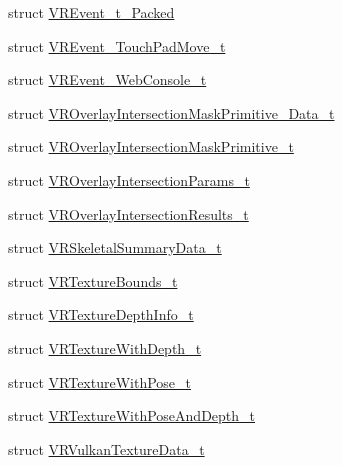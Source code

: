 \begin{DoxyCompactItemize}
struct \mbox{\hyperlink{struct_valve_1_1_v_r_1_1_v_r_event__t___packed}{V\+R\+Event\+\_\+t\+\_\+\+Packed}}
\item 
struct \mbox{\hyperlink{struct_valve_1_1_v_r_1_1_v_r_event___touch_pad_move__t}{V\+R\+Event\+\_\+\+Touch\+Pad\+Move\+\_\+t}}
\item 
struct \mbox{\hyperlink{struct_valve_1_1_v_r_1_1_v_r_event___web_console__t}{V\+R\+Event\+\_\+\+Web\+Console\+\_\+t}}
\item 
struct \mbox{\hyperlink{struct_valve_1_1_v_r_1_1_v_r_overlay_intersection_mask_primitive___data__t}{V\+R\+Overlay\+Intersection\+Mask\+Primitive\+\_\+\+Data\+\_\+t}}
\item 
struct \mbox{\hyperlink{struct_valve_1_1_v_r_1_1_v_r_overlay_intersection_mask_primitive__t}{V\+R\+Overlay\+Intersection\+Mask\+Primitive\+\_\+t}}
\item 
struct \mbox{\hyperlink{struct_valve_1_1_v_r_1_1_v_r_overlay_intersection_params__t}{V\+R\+Overlay\+Intersection\+Params\+\_\+t}}
\item 
struct \mbox{\hyperlink{struct_valve_1_1_v_r_1_1_v_r_overlay_intersection_results__t}{V\+R\+Overlay\+Intersection\+Results\+\_\+t}}
\item 
struct \mbox{\hyperlink{struct_valve_1_1_v_r_1_1_v_r_skeletal_summary_data__t}{V\+R\+Skeletal\+Summary\+Data\+\_\+t}}
\item 
struct \mbox{\hyperlink{struct_valve_1_1_v_r_1_1_v_r_texture_bounds__t}{V\+R\+Texture\+Bounds\+\_\+t}}
\item 
struct \mbox{\hyperlink{struct_valve_1_1_v_r_1_1_v_r_texture_depth_info__t}{V\+R\+Texture\+Depth\+Info\+\_\+t}}
\item 
struct \mbox{\hyperlink{struct_valve_1_1_v_r_1_1_v_r_texture_with_depth__t}{V\+R\+Texture\+With\+Depth\+\_\+t}}
\item 
struct \mbox{\hyperlink{struct_valve_1_1_v_r_1_1_v_r_texture_with_pose__t}{V\+R\+Texture\+With\+Pose\+\_\+t}}
\item 
struct \mbox{\hyperlink{struct_valve_1_1_v_r_1_1_v_r_texture_with_pose_and_depth__t}{V\+R\+Texture\+With\+Pose\+And\+Depth\+\_\+t}}
\item 
struct \mbox{\hyperlink{struct_valve_1_1_v_r_1_1_v_r_vulkan_texture_data__t}{V\+R\+Vulkan\+Texture\+Data\+\_\+t}}
\end{DoxyCompactItemize}
